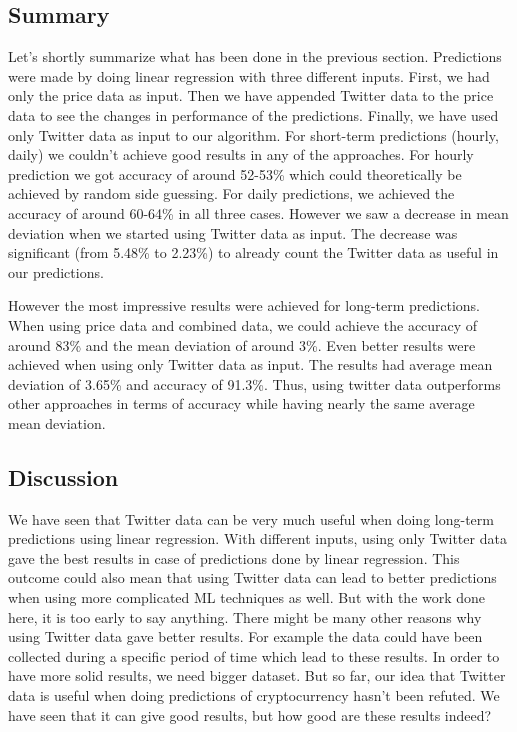 \documentclass[a4paper,11pt,oneside]{article}
\begin{document}
  \subsection{Summary}
  
  Let's shortly summarize what has been done in the previous section. Predictions were made by doing linear regression with three different inputs. First, we had only the price data as input. Then we have appended Twitter data to the price data to see the changes in performance of the predictions. Finally, we have used only Twitter data as input to our algorithm. For short-term predictions (hourly, daily) we couldn't achieve good results in any of the approaches. For hourly prediction we got accuracy of around 52-53\% which could theoretically be achieved by random side guessing. For daily predictions, we achieved the accuracy of around 60-64\% in all three cases. However we saw a decrease in mean deviation when we started using Twitter data as input. The decrease was significant (from 5.48\% to 2.23\%) to already count the Twitter data as useful in our predictions. 
  
  However the most impressive results were achieved for long-term predictions. When using price data and combined data, we could achieve the accuracy of around 83\% and the mean deviation of around 3\%. Even better results were achieved when using only Twitter data as input. The results had average mean deviation of 3.65\% and accuracy of 91.3\%. Thus, using twitter data outperforms other approaches in terms of accuracy while having nearly the same average mean deviation. 
  
  \subsection{Discussion}
 
  We have seen that Twitter data can be very much useful when doing long-term predictions using linear regression. With different inputs, using only Twitter data gave the best results in case of predictions done by linear regression. This outcome could also mean that using Twitter data can lead to better predictions when using more complicated ML techniques as well. But with the work done here, it is too early to say anything. There might be many other reasons why using Twitter data gave better results. For example the data could have been collected during a specific period of time which lead to these results. In order to have more solid results, we need bigger dataset. But so far, our idea that Twitter data is useful when doing predictions of cryptocurrency hasn't been refuted. We have seen that it can give good results, but how good are these results indeed?
  
\end{document}
